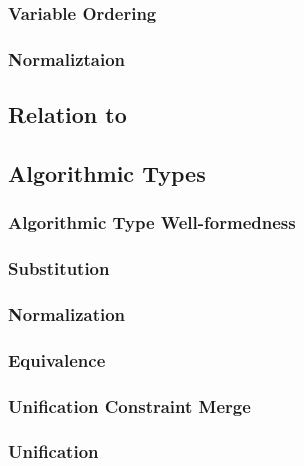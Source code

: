 \subsubsection{Variable Ordering}


\subsubsection{Normaliztaion}


\subsection{Relation to \systemf}



\subsection{Algorithmic Types}

\subsubsection{Algorithmic Type Well-formedness}


\subsubsection{Substitution}


\subsubsection{Normalization}


\subsubsection{Equivalence}


\subsubsection{Unification Constraint Merge}


\subsubsection{Unification}
\

